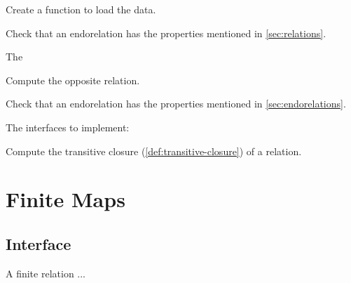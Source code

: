 \begin{exercise}
\begin{exercise}
Create a function to load the data.


%

\end{exercise}


%  

\begin{exercise}

Check that an endorelation has the properties mentioned in \cref{sec:relations}.

The

\end{exercise}




\begin{exercise}[Opposite]
Compute the opposite relation.


\end{exercise}

\begin{exercise}

Check that an endorelation has the properties mentioned in \cref{sec:endorelations}.

The interfaces to implement:

\end{exercise}

\begin{exercise}
Compute the transitive closure (\cref{def:transitive-closure}) of a relation.


\end{exercise}


\section{Finite Maps}

\subsection*{Interface}

A finite relation  ...


\end{exercise}
